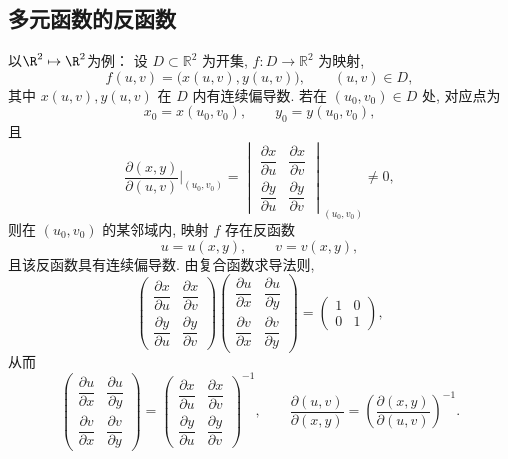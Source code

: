 \subsection*{多元函数的反函数}
以$\R^2 \mapsto \R^2$为例：
设 $D\subset\mathbb{R}^2$ 为开集, $f:D\to\mathbb{R}^2$ 为映射,
\[
f(u,v)=\bigl(x(u,v),y(u,v)\bigr),
\qquad (u,v)\in D,
\]
其中 $x(u,v),y(u,v)$ 在 $D$ 内有连续偏导数. 若在
$(u_0,v_0)\in D$ 处, 对应点为
\[
x_0=x(u_0,v_0),\qquad y_0=y(u_0,v_0),
\]
且
\[
\frac{\partial(x,y)}{\partial(u,v)}\bigg|_{(u_0,v_0)}
=\begin{vmatrix}
\dfrac{\partial x}{\partial u}&\dfrac{\partial x}{\partial v}\\[4pt]
\dfrac{\partial y}{\partial u}&\dfrac{\partial y}{\partial v}
\end{vmatrix}_{(u_0,v_0)}\ne0,
\]
则在 $(u_0,v_0)$ 的某邻域内, 映射 $f$ 存在反函数
\[
u=u(x,y),\qquad v=v(x,y),
\]
且该反函数具有连续偏导数. 由复合函数求导法则,
\[
\begin{pmatrix}
\dfrac{\partial x}{\partial u}&\dfrac{\partial x}{\partial v}\\[5pt]
\dfrac{\partial y}{\partial u}&\dfrac{\partial y}{\partial v}
\end{pmatrix}
\begin{pmatrix}
\dfrac{\partial u}{\partial x}&\dfrac{\partial u}{\partial y}\\[5pt]
\dfrac{\partial v}{\partial x}&\dfrac{\partial v}{\partial y}
\end{pmatrix}
=\begin{pmatrix}1&0\\0&1\end{pmatrix},
\]
从而
\[
\begin{pmatrix}
\dfrac{\partial u}{\partial x}&\dfrac{\partial u}{\partial y}\\[5pt]
\dfrac{\partial v}{\partial x}&\dfrac{\partial v}{\partial y}
\end{pmatrix}
=\begin{pmatrix}
\dfrac{\partial x}{\partial u}&\dfrac{\partial x}{\partial v}\\[5pt]
\dfrac{\partial y}{\partial u}&\dfrac{\partial y}{\partial v}
\end{pmatrix}^{-1},
\qquad
\frac{\partial(u,v)}{\partial(x,y)}
=\left(\frac{\partial(x,y)}{\partial(u,v)}\right)^{-1}.
\]


